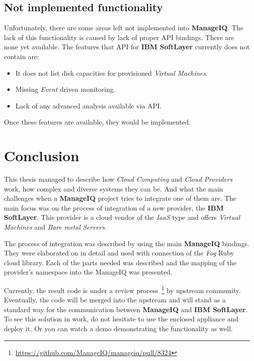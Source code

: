 \section{Not implemented functionality}
\label{sec:Not implemented functionality}

Unfortunately, there are some areas left not implemented into \textbf{ManageIQ}. The lack of this functionality is caused by lack of proper API bindings. There are none yet available. The features that API for \textbf{IBM SoftLayer} currently does not contain are:

\begin{itemize}
	\item It does not list disk capacities for provisioned \emph{Virtual Machines}.
	\item Missing \emph{Event} driven monitoring.
	\item Lack of any advanced analysis available via API.\@
\end{itemize}

Once these features are available, they would be implemented.

\chapter{Conclusion}
\label{chap:Conclusion}

This thesis managed to describe how \emph{Cloud Computing} and \emph{Cloud Providers} work, how complex and diverse systems they can be. And what the main challenges when a \textbf{ManageIQ} project tries to integrate one of them are. The main focus was on the process of integration of a new provider, the \textbf{IBM SoftLayer}. This provider is a cloud vendor of the \emph{IaaS} type and offers \emph{Virtual Machines} and \emph{Bare metal Servers}.

The process of integration was described by using the main \textbf{ManageIQ} bindings. They were elaborated on in detail and used with connection of the \emph{Fog} Ruby cloud library. Each of the parts needed was described and the mapping of the provider's namespace into the {ManageIQ} was presented.

Currently, the result code is under a review process~\footnote{\url{https://github.com/ManageIQ/manageiq/pull/8324}} by upstream community. Eventually, the code will be merged into the upstream and will stand as a standard way for the communication between \textbf{ManageIQ} and \textbf{IBM SoftLayer}. To see this solution in work, do not hesitate to use the enclosed appliance and deploy it. Or you can watch a demo demonstrating the functionality as well.
